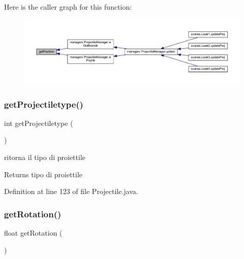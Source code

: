 Here is the caller graph for this function\+:\nopagebreak
\begin{figure}[H]
\begin{center}
\leavevmode
\includegraphics[width=350pt]{classobjects_1_1_projectile_a6b73c36e7bd98fd9cfbffa2ff11cc10e_icgraph}
\end{center}
\end{figure}
\mbox{\label{classobjects_1_1_projectile_a2dbf5e3a5bf7a6d90d11cb469b59776b}} 
\subsubsection{\texorpdfstring{get\+Projectiletype()}{getProjectiletype()}}
{\footnotesize\ttfamily int get\+Projectiletype (\begin{DoxyParamCaption}{ }\end{DoxyParamCaption})}



ritorna il tipo di proiettile 

\begin{DoxyReturn}{Returns}
tipo di proiettile 
\end{DoxyReturn}


Definition at line 123 of file Projectile.\+java.

\mbox{\label{classobjects_1_1_projectile_aa60864de0b3c57fee5ae403229f41228}} 
\subsubsection{\texorpdfstring{get\+Rotation()}{getRotation()}}
{\footnotesize\ttfamily float get\+Rotation (\begin{DoxyParamCaption}{ }\end{DoxyParamCaption})}



